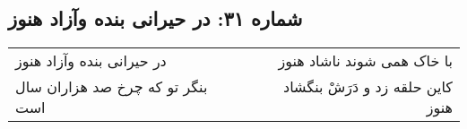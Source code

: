 \begin{center}
\section*{شماره ۳۱: در حیرانی بنده وآزاد هنوز}
\label{sec:031}
\begin{longtable}{l p{0.5cm} r}
در حیرانی بنده وآزاد هنوز
&&
با خاک همی شوند ناشاد هنوز
\\
بنگر تو که چرخ صد هزاران سال است
&&
کاین حلقه زد و دَرَشْ بنگشاد هنوز
\\
\end{longtable}
\end{center}
